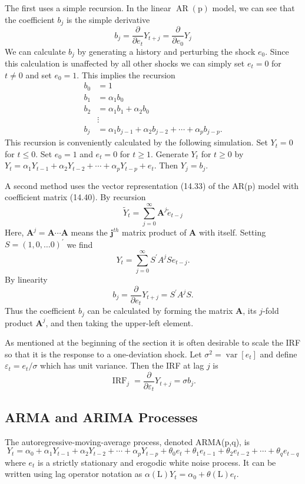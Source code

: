 \documentclass[10pt]{article}
\begin{document}
The first uses a simple recursion. In the linear $\operatorname{AR}(\mathrm{p})$ model, we can see that the coefficient $b_{j}$ is the simple derivative
$$
b_{j}=\frac{\partial}{\partial e_{t}} Y_{t+j}=\frac{\partial}{\partial e_{0}} Y_{j}
$$
We can calculate $b_{j}$ by generating a history and perturbing the shock $e_{0}$. Since this calculation is unaffected by all other shocks we can simply set $e_{t}=0$ for $t \neq 0$ and set $e_{0}=1$. This implies the recursion
$$
\begin{aligned}
b_{0} &=1 \\
b_{1} &=\alpha_{1} b_{0} \\
b_{2} &=\alpha_{1} b_{1}+\alpha_{2} b_{0} \\
& \vdots \\
b_{j} &=\alpha_{1} b_{j-1}+\alpha_{2} b_{j-2}+\cdots+\alpha_{p} b_{j-p} .
\end{aligned}
$$
This recursion is conveniently calculated by the following simulation. Set $Y_{t}=0$ for $t \leq 0$. Set $e_{0}=1$ and $e_{t}=0$ for $t \geq 1$. Generate $Y_{t}$ for $t \geq 0$ by $Y_{t}=\alpha_{1} Y_{t-1}+\alpha_{2} Y_{t-2}+\cdots+\alpha_{p} Y_{t-p}+e_{t}$. Then $Y_{j}=b_{j}$.

A second method uses the vector representation (14.33) of the AR(p) model with coefficient matrix (14.40). By recursion
$$
\widetilde{Y}_{t}=\sum_{j=0}^{\infty} \boldsymbol{A}^{j} \widetilde{e}_{t-j}
$$
Here, $\boldsymbol{A}^{j}=\boldsymbol{A} \cdots \boldsymbol{A}$ means the $\boldsymbol{j}^{t h}$ matrix product of $\boldsymbol{A}$ with itself. Setting $S=(1,0, \ldots 0)^{\prime}$ we find
$$
Y_{t}=\sum_{j=0}^{\infty} S^{\prime} A^{j} S e_{t-j} .
$$
By linearity
$$
b_{j}=\frac{\partial}{\partial e_{t}} Y_{t+j}=S^{\prime} A^{j} S .
$$
Thus the coefficient $b_{j}$ can be calculated by forming the matrix $\boldsymbol{A}$, its $j$-fold product $\boldsymbol{A}^{j}$, and then taking the upper-left element.

As mentioned at the beginning of the section it is often desirable to scale the IRF so that it is the response to a one-deviation shock. Let $\sigma^{2}=\operatorname{var}\left[e_{t}\right]$ and define $\varepsilon_{t}=e_{t} / \sigma$ which has unit variance. Then the IRF at lag $j$ is
$$
\operatorname{IRF}_{j}=\frac{\partial}{\partial \varepsilon_{t}} Y_{t+j}=\sigma b_{j} .
$$

\subsection{ARMA and ARIMA Processes}
The autoregressive-moving-average process, denoted ARMA(p,q), is
$$
Y_{t}=\alpha_{0}+\alpha_{1} Y_{t-1}+\alpha_{2} Y_{t-2}+\cdots+\alpha_{p} Y_{t-p}+\theta_{0} e_{t}+\theta_{1} e_{t-1}+\theta_{2} e_{t-2}+\cdots+\theta_{q} e_{t-q}
$$
where $e_{t}$ is a strictly stationary and erogodic white noise process. It can be written using lag operator notation as $\alpha(\mathrm{L}) Y_{t}=\alpha_{0}+\theta(\mathrm{L}) e_{t}$.
\end{document}
